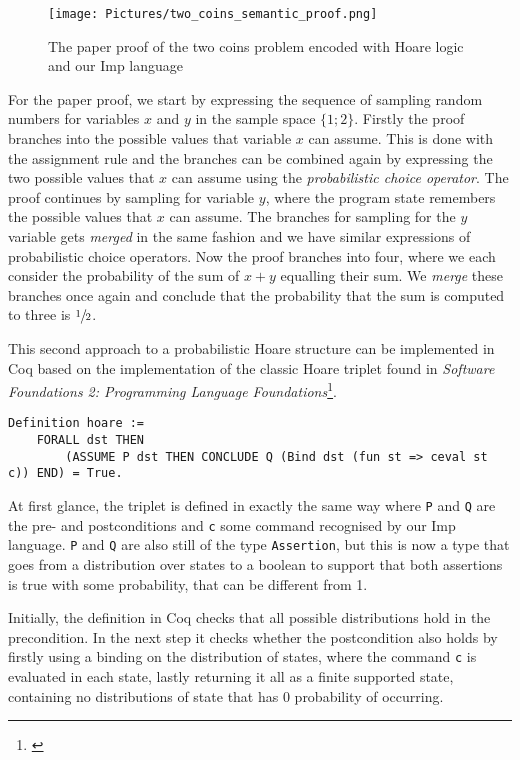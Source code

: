\begin{wrapfigure}{r}{0.4\textwidth}\centering
    \texttt{[image: Pictures/two\_coins\_semantic\_proof.png]}
    \caption{The paper proof of the two coins problem encoded with Hoare logic and our Imp language}
\end{wrapfigure}

For the paper proof, we start by expressing the sequence of sampling random numbers for variables $x$ and $y$ in the sample space $\{1; 2\}$. Firstly the proof branches into the possible values that variable $x$ can assume. This is done with the assignment rule and the branches can be combined again by expressing the two possible values that $x$ can assume using the \textit{probabilistic choice operator}. The proof continues by sampling for variable $y$, where the program state remembers the possible values that $x$ can assume. The branches for sampling for the $y$ variable gets \textit{merged} in the same fashion and we have similar expressions of probabilistic choice operators. Now the proof branches into four, where we each consider the probability of the sum of $x + y$ equalling their sum. We \textit{merge} these branches once again and conclude that the probability that the sum is computed to three is $\sfrac{1}{2}$.

 \label{meatApp2Imp}
This second approach to a probabilistic Hoare structure can be implemented in Coq based on the implementation of the classic Hoare triplet found in \textit{Software Foundations 2: Programming Language Foundations}\footnote{\textcite{SF2}}. 

\begin{verbatim}
Definition hoare :=
    FORALL dst THEN
        (ASSUME P dst THEN CONCLUDE Q (Bind dst (fun st => ceval st c)) END) = True.
\end{verbatim}

At first glance, the triplet is defined in exactly the same way where \texttt{P} and \texttt{Q} are the pre- and postconditions and \texttt{c} some command recognised by our Imp language. \texttt{P} and \texttt{Q} are also still of the type \texttt{Assertion}, but this is now a type that goes from a distribution over states to a boolean to support that both assertions is true with some probability, that can be different from 1.   

Initially, the definition in Coq checks that all possible distributions hold in the precondition. In the next step it checks whether the postcondition also holds by firstly using a binding on the distribution of states, where the command \texttt{c} is evaluated in each state, lastly returning it all as a finite supported state, containing no distributions of state that has 0 probability of occurring.


